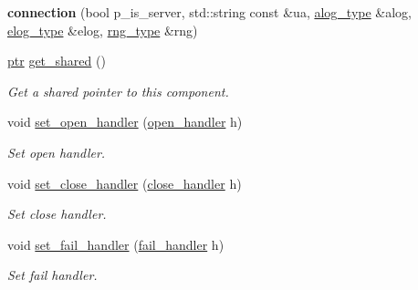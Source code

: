\begin{DoxyCompactItemize}
\item 
\mbox{\label{classwebsocketpp_1_1connection_a525947d8d33ee1e410d02706246ffe94}} 
{\bfseries connection} (bool p\+\_\+is\+\_\+server, std\+::string const \&ua, \mbox{\hyperlink{classwebsocketpp_1_1connection_a2da7d18aecf9153429bab9fcd2bab7b8}{alog\+\_\+type}} \&alog, \mbox{\hyperlink{classwebsocketpp_1_1connection_a80314ab2e4ddefdd4783fb1934fedee6}{elog\+\_\+type}} \&elog, \mbox{\hyperlink{classwebsocketpp_1_1connection_afc276f2f61d5b1acfadc64f91b3f89e5}{rng\+\_\+type}} \&rng)
\item 
\mbox{\label{classwebsocketpp_1_1connection_a01a5af7dc2f35ff8f15da8c2cf3a3b02}} 
\mbox{\hyperlink{classwebsocketpp_1_1connection_ab910d42e3bde91546183cc54642f32ab}{ptr}} \mbox{\hyperlink{classwebsocketpp_1_1connection_a01a5af7dc2f35ff8f15da8c2cf3a3b02}{get\+\_\+shared}} ()
\begin{DoxyCompactList}\small\item\em Get a shared pointer to this component. \end{DoxyCompactList}\item 
void \mbox{\hyperlink{classwebsocketpp_1_1connection_ab11271e7778fbfde3a1987fca729af6d}{set\+\_\+open\+\_\+handler}} (\mbox{\hyperlink{namespacewebsocketpp_a53c8b4ae59cf13b5f883b119bbd14d72}{open\+\_\+handler}} h)
\begin{DoxyCompactList}\small\item\em Set open handler. \end{DoxyCompactList}\item 
void \mbox{\hyperlink{classwebsocketpp_1_1connection_a25fb7096431b1d7350c34035db7ed9a4}{set\+\_\+close\+\_\+handler}} (\mbox{\hyperlink{namespacewebsocketpp_a27acb39e01cbca06ccc4e4e8eb8f877d}{close\+\_\+handler}} h)
\begin{DoxyCompactList}\small\item\em Set close handler. \end{DoxyCompactList}\item 
void \mbox{\hyperlink{classwebsocketpp_1_1connection_a8d2515bc6821f90c531efe77c8a32569}{set\+\_\+fail\+\_\+handler}} (\mbox{\hyperlink{namespacewebsocketpp_a5bb2e61cfe649b2e012f1a2c5693a4d5}{fail\+\_\+handler}} h)
\begin{DoxyCompactList}\small\item\em Set fail handler. \end{DoxyCompactList}\item 

\end{DoxyCompactItemize}
